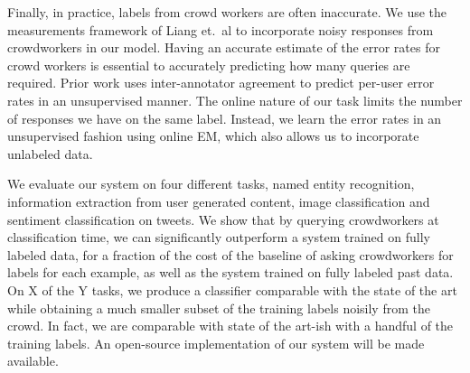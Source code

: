 Finally, in practice, labels from crowd workers are often inaccurate.
We use the measurements framework of Liang et.\ al\cite{liang09measurements} to incorporate noisy responses from crowdworkers in our model.
Having an accurate estimate of the error rates for crowd workers is essential to accurately predicting how many queries are required.
Prior work uses inter-annotator agreement to predict per-user error rates in an unsupervised manner. 
The online nature of our task limits the number of responses we have on the same label.
Instead, we learn the error rates in an unsupervised fashion using online EM, which also allows us to incorporate unlabeled data.

We evaluate our system on four different tasks, named entity recognition, information extraction from user generated content, image classification and sentiment classification on tweets.
We show that by querying crowdworkers at classification time, we can significantly outperform a system trained on fully labeled data, for a fraction of the cost of the baseline of asking crowdworkers for labels for each example, as well as the system trained on fully labeled past data.
On X of the Y tasks, we produce a classifier comparable with the state of the art while obtaining a much smaller subset of the training labels noisily from the crowd. 
In fact, we are comparable with state of the art-ish with a handful of the training labels.
An open-source implementation of our system will be made available.

